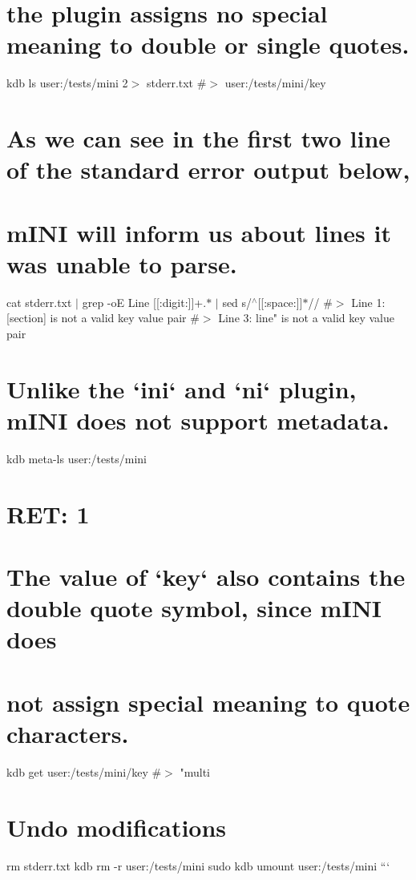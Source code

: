 \hypertarget{autotoc_md371_autotoc_md390}{}\section{the plugin assigns no special meaning to double or single quotes.}\label{autotoc_md371_autotoc_md390}
kdb ls user\+:/tests/mini 2$>$ stderr.\+txt \#$>$ user\+:/tests/mini/key\hypertarget{autotoc_md371_autotoc_md391}{}\section{As we can see in the first two line of the standard error output below,}\label{autotoc_md371_autotoc_md391}
\hypertarget{autotoc_md371_autotoc_md392}{}\section{m\+I\+N\+I will inform us about lines it was unable to parse.}\label{autotoc_md371_autotoc_md392}
cat stderr.\+txt $\vert$ grep -\/oE \textquotesingle{}Line \mbox{[}\mbox{[}\+:digit\+:\mbox{]}\mbox{]}+.$\ast$\textquotesingle{} $\vert$ sed \textquotesingle{}s/$^\wedge$\mbox{[}\mbox{[}\+:space\+:\mbox{]}\mbox{]}$\ast$//\textquotesingle{} \#$>$ Line 1\+: \textquotesingle{}\mbox{[}section\mbox{]}\textquotesingle{} is not a valid key value pair \#$>$ Line 3\+: \textquotesingle{}line"\textquotesingle{} is not a valid key value pair\hypertarget{autotoc_md371_autotoc_md393}{}\section{Unlike the `ini` and `ni` plugin, m\+I\+N\+I does not support metadata.}\label{autotoc_md371_autotoc_md393}
kdb meta-\/ls user\+:/tests/mini \hypertarget{autotoc_md371_autotoc_md394}{}\section{R\+E\+T\+: 1}\label{autotoc_md371_autotoc_md394}
\hypertarget{autotoc_md371_autotoc_md395}{}\section{The value of `key` also contains the double quote symbol, since m\+I\+N\+I does}\label{autotoc_md371_autotoc_md395}
\hypertarget{autotoc_md371_autotoc_md396}{}\section{not assign special meaning to quote characters.}\label{autotoc_md371_autotoc_md396}
kdb get user\+:/tests/mini/key \#$>$ "multi\hypertarget{autotoc_md371_autotoc_md397}{}\section{Undo modifications}\label{autotoc_md371_autotoc_md397}
rm stderr.\+txt kdb rm -\/r user\+:/tests/mini sudo kdb umount user\+:/tests/mini ``` 